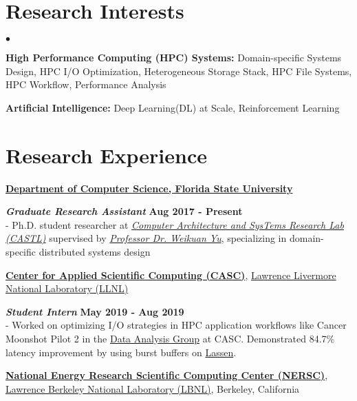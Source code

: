 \documentclass[margin,line]{res}
\newenvironment{list2}{
  \begin{list}{$\bullet$}{%
      \setlength{\itemsep}{0in}
      \setlength{\parsep}{0in} \setlength{\parskip}{0in}
      \setlength{\topsep}{0in} \setlength{\partopsep}{0in} 
      \setlength{\leftmargin}{0.2in}}}{\end{list}}
\begin{document}
\begin{resume}
\section{\sc Research Interests}
\begin{list2}
\item \textbf{High Performance Computing (HPC) Systems:} Domain-specific Systems Design, HPC I/O Optimization, Heterogeneous Storage Stack, HPC File Systems, HPC Workflow, Performance Analysis
\item \textbf{Artificial Intelligence:} Deep Learning(DL) at Scale, Reinforcement Learning
\end{list2}

\vspace*{-.05in}

\section{\sc Research Experience}
{\bf \href{http://www.cs.fsu.edu/}{Department of Computer Science, Florida State University}}

\vspace{-.4cm}
\textbf{{\em Graduate Research Assistant}} \hfill {\bf Aug 2017 - Present}\\
- Ph.D. student researcher at \textit{\href{http://castl.cs.fsu.edu/doku.php/}{Computer Architecture and SysTems Research Lab (CASTL)}} supervised by \textit{\href{https://www.cs.fsu.edu/~yuw/}{Professor Dr. Weikuan Yu}}, specializing in domain-specific distributed systems design

\vspace{-.25cm}
{\bf \href{https://computing.llnl.gov/casc}{Center for Applied Scientific Computing (CASC)}}, \href{http://www.llnl.gov/}{Lawrence Livermore National Laboratory (LLNL)}

\vspace{-.4cm}
\textbf{{\em Student Intern}} \hfill {\bf May 2019 - Aug 2019}\\
- Worked on optimizing I/O strategies in HPC application workflows like Cancer Moonshot Pilot 2 in the \href{https://computing.llnl.gov/casc/data-analysis-group}{Data Analysis Group} at CASC. Demonstrated 84.7\% latency improvement by using burst buffers on \href{https://hpc.llnl.gov/hardware/platforms/lassen}{Lassen}.

\vspace{-.25cm}
{\bf \href{http://www.nersc.gov/}{National Energy Research Scientific Computing Center (NERSC)}}, \href{http://www.lbl.gov/}{Lawrence Berkeley National Laboratory (LBNL)}, Berkeley, California


\end{resume}
\end{document}
